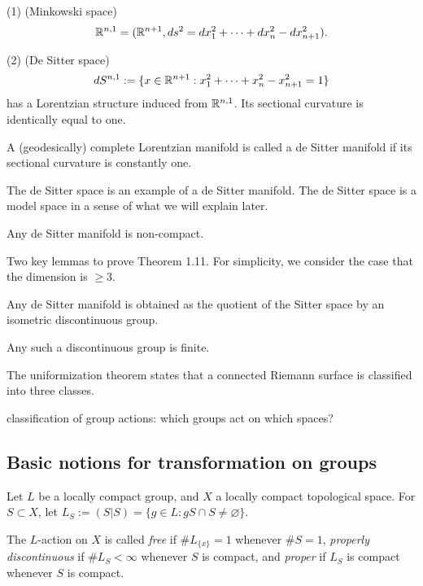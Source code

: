 \documentclass{../../../small}
\begin{document}
\begin{ex}
(1) (Minkowski space)
\[\mathbb{R}^{n,1}=(\mathbb{R}^{n+1},ds^2=dx_1^2+\cdots+dx_n^2-dx_{n+1}^2).\]

(2) (De Sitter space)
\[dS^{n,1}:=\{x\in\mathbb{R}^{n+1}:x_1^2+\cdots+x_n^2-x_{n+1}^2=1\}\]
has a Lorentzian structure induced from $\mathbb{R}^{n,1}$.
Its sectional curvature is identically equal to one.
\end{ex}

\begin{defn}
A (geodesically) complete Lorentzian manifold is called a de Sitter manifold if its sectional curvature is constantly one.
\end{defn}

\begin{ex}
The de Sitter space is an example of a de Sitter manifold.
The de Sitter space is a model space in a sense of what we will explain later.
\end{ex}

\begin{thm}
Any de Sitter manifold is non-compact.
\end{thm}

Two key lemmas to prove Theorem 1.11.
For simplicity, we consider the case that the dimension is $\ge3$.
\begin{lem}
Any de Sitter manifold is obtained as the quotient of the Sitter space by an isometric discontinuous group.
\end{lem}
\begin{lem}
Any such a discontinuous group is finite.
\end{lem}

The uniformization theorem states that a connected Riemann surface is classified into three classes.


classification of group actions: which groups act on which spaces?

\newpage
\subsection*{Basic notions for transformation on groups}
\setcounter{section}{2}
\setcounter{thm}{0}

Let $L$ be a locally compact group, and $X$ a locally compact topological space.
For $S\subset X$, let $L_S:=(S|S)=\{g\in L:gS\cap S\ne\varnothing\}$.

\begin{defn}
The $L$-action on $X$ is called \emph{free} if $\#L_{\{x\}}=1$ whenever $\#S=1$, \emph{properly discontinuous} if $\#L_S<\infty$ whenever $S$ is compact, and \emph{proper} if $L_S$ is compact whenever $S$ is compact.
\end{defn}
\end{document}
